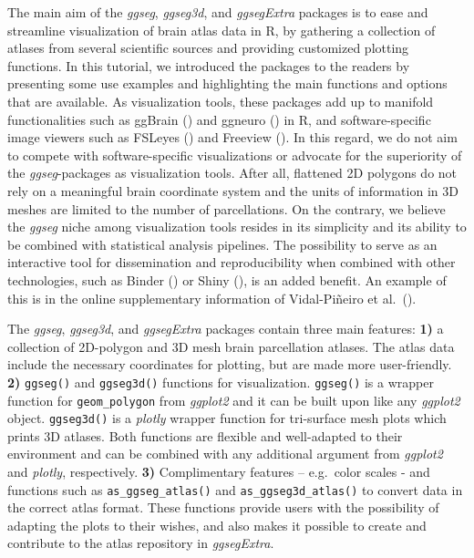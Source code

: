 \documentclass[fleqn,10pt]{wlpeerj} %
\begin{document}
The main aim of the \emph{ggseg}, \emph{ggseg3d}, and \emph{ggsegExtra} packages is to ease and streamline visualization of brain atlas data in R, by gathering a collection of atlases from several scientific sources and providing customized plotting functions.
In this tutorial, we introduced the packages to the readers by presenting some use examples and highlighting the main functions and options that are available.
As visualization tools, these packages add up to manifold functionalities such as ggBrain (\citet{ggBrain}) and ggneuro (\citet{ggneuro}) in R, and software-specific image viewers such as FSLeyes (\citet{fsleyes}) and Freeview (\citet{dale_99}).
In this regard, we do not aim to compete with software-specific visualizations or advocate for the superiority of the \emph{ggseg}-packages as visualization tools.
After all, flattened 2D polygons do not rely on a meaningful brain coordinate system and the units of information in 3D meshes are limited to the number of parcellations.
On the contrary, we believe the \emph{ggseg} niche among visualization tools resides in its simplicity and its ability to be combined with statistical analysis pipelines.
The possibility to serve as an interactive tool for dissemination and reproducibility when combined with other technologies, such as Binder (\citet{binder}) or Shiny (\citet{shiny}), is an added benefit.
An example of this is in the online supplementary information of Vidal-Piñeiro et al.~(\citeyearpar{vidal_2019}).

The \emph{ggseg}, \emph{ggseg3d}, and \emph{ggsegExtra} packages contain three main features:
\textbf{1)} a collection of 2D-polygon and 3D mesh brain parcellation atlases.
The atlas data include the necessary coordinates for plotting, but are made more user-friendly.
\textbf{2)} \texttt{ggseg()} and \texttt{ggseg3d()} functions for visualization.
\texttt{ggseg()} is a wrapper function for \texttt{geom\_polygon} from \emph{ggplot2} and it can be built upon like any \emph{ggplot2} object.
\texttt{ggseg3d()} is a \emph{plotly} wrapper function for tri-surface mesh plots which prints 3D atlases.
Both functions are flexible and well-adapted to their environment and can be combined with any additional argument from \emph{ggplot2} and \emph{plotly}, respectively.
\textbf{3)} Complimentary features -- e.g.~color scales - and functions such as \texttt{as\_ggseg\_atlas()} and \texttt{as\_ggseg3d\_atlas()} to convert data in the correct atlas format.
These functions provide users with the possibility of adapting the plots to their wishes, and also makes it possible to create and contribute to the atlas repository in \emph{ggsegExtra}.
\end{document}
